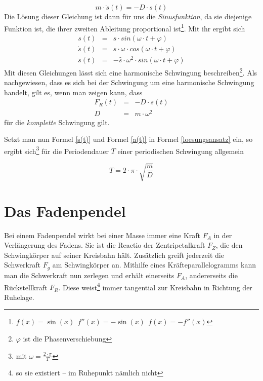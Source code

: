 	\begin{equation}
	m \cdot \ddot{s}(t) = - D \cdot s(t)
		\label{loesungsansatz}
	\end{equation}
	Die Lösung dieser Gleichung ist dann für uns die \textit{Sinusfunktion}, da
    sie diejenige Funktion ist, die ihrer zweiten Ableitung proportional
    ist\footnote{\(f(x) = \sin(x) ~~ f''(x) = - \sin(x)  ~~ f(x) = - f''(x)\)}. Mit ihr ergibt sich
	\begin{eqnarray}
		s(t) & = & \hat{s} \cdot sin(\omega \cdot t + \varphi) 
			\label{s(t)} \\
		\dot{s}(t) & = & \hat{s} \cdot \omega \cdot cos(\omega \cdot t + \varphi ) \\
		\ddot{s}(t) & = & - \hat{s} \cdot \omega^2 \cdot sin(\omega \cdot t + \varphi)
			\label{a(t)}
	\end{eqnarray}
Mit diesen Gleichungen lässt sich eine harmonische Schwingung beschreiben\footnote{\(\varphi\) ist die Phasenverschiebung}. Als nachgewiesen, dass es sich bei der Schwingung um eine harmonische Schwingung handelt, gilt es, wenn man zeigen kann, dass
	\begin{eqnarray}
		F_R(t) &=& - D \cdot s(t) 
			\label{F sim s}\\
		D &=& m \cdot \omega^2
	\end{eqnarray}
 für die \emph{komplette} Schwingung gilt.


Setzt man nun Formel \ref{s(t)} und Formel \ref{a(t)} in Formel \ref{loesungsansatz} ein, so ergibt sich\footnote{mit \(\omega = \frac{2 \cdot \pi}{T}\)} für die Periodendauer \(T\) einer periodischen Schwingung allgemein

	\begin{equation}
		T = 2 \cdot \pi \cdot \sqrt{\frac{m}{D}}
			\label{T}
	\end{equation}

		
		
		
		
		\section{Das Fadenpendel}


Bei einem Fadenpendel wirkt bei einer Masse immer eine Kraft
\(F_A\) in der Verlängerung des Fadens. Sie ist die Reactio der Zentripetalkraft
\(F_Z\), die den Schwingkörper auf seiner Kreisbahn hält. Zusätzlich greift
jederzeit die Schwerkraft \(F_g\) am Schwingkörper an. Mithilfe eines
Kräfteparallelogramms kann man die Schwerkraft nun zerlegen und erhält
einerseits \(F_A\), andererseits die Rückstellkraft \(F_R\). Diese
weist\footnote{so sie existiert -- im Ruhepunkt nämlich nicht} immer tangential zur Kreisbahn in Richtung der Ruhelage.


